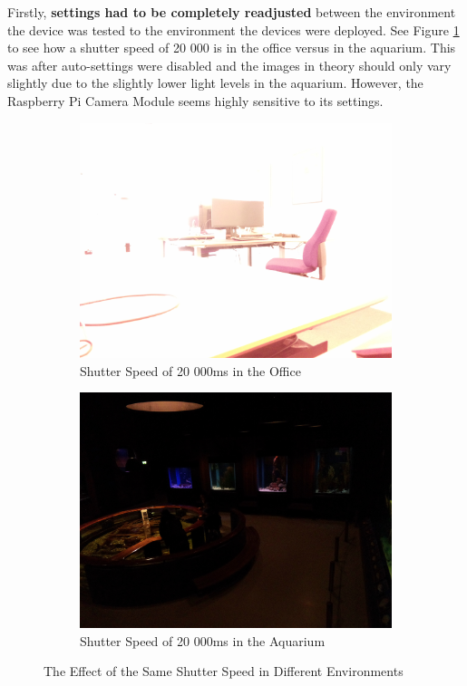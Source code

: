 Firstly, \textbf{settings had to be completely readjusted} between the environment the device was tested to the environment the devices were deployed. See Figure \ref{fig:capture_environment_settings} to see how a shutter speed of 20 000 is in the office versus in the aquarium. This was after auto-settings were disabled and the images in theory should only vary slightly due to the slightly lower light levels in the aquarium. However, the Raspberry Pi Camera Module seems highly sensitive to its settings.

\begin{figure}[H]
    \centering
    \begin{subfigure}{0.49\textwidth}
        \centering
        \includegraphics[width=\textwidth]{Images/DeviceImages/2nd-iteration/ss20000_office.jpg}
        \caption{Shutter Speed of 20 000ms in the Office}
    \end{subfigure}
    \hfill
    \begin{subfigure}{0.49\textwidth}
        \centering
        \includegraphics[width=\textwidth]{Images/DeviceImages/2nd-iteration/ss20000_fimus.jpg}
        \caption{Shutter Speed of 20 000ms in the Aquarium}
    \end{subfigure}
    \caption{The Effect of the Same Shutter Speed in Different Environments}
    \label{fig:capture_environment_settings}
\end{figure}

